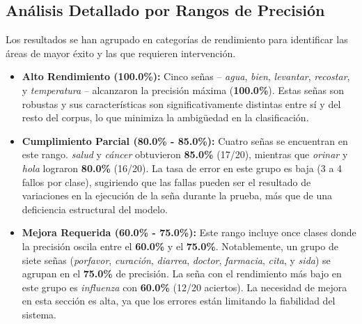 \subsection{Análisis Detallado por Rangos de Precisión}

Los resultados se han agrupado en categorías de rendimiento para identificar las áreas de mayor éxito y las que requieren intervención.

\begin{itemize}
    \item \textbf{Alto Rendimiento (100.0\%):}
    Cinco señas -- \textit{agua}, \textit{bien}, \textit{levantar}, \textit{recostar}, y \textit{temperatura} -- alcanzaron la precisión máxima (\textbf{100.0\%}). Estas señas son robustas y sus características son significativamente distintas entre sí y del resto del corpus, lo que minimiza la ambigüedad en la clasificación.

    \item \textbf{Cumplimiento Parcial (80.0\% - 85.0\%):}
    Cuatro señas se encuentran en este rango. \textit{salud} y \textit{cáncer} obtuvieron \textbf{85.0\%} (17/20), mientras que \textit{orinar} y \textit{hola} lograron \textbf{80.0\%} (16/20). La tasa de error en este grupo es baja (3 a 4 fallos por clase), sugiriendo que las fallas pueden ser el resultado de variaciones en la ejecución de la seña durante la prueba, más que de una deficiencia estructural del modelo.

    \item \textbf{Mejora Requerida (60.0\% - 75.0\%):}
    Este rango incluye once clases donde la precisión oscila entre el \textbf{60.0\%} y el \textbf{75.0\%}. Notablemente, un grupo de siete señas (\textit{porfavor}, \textit{curación}, \textit{diarrea}, \textit{doctor}, \textit{farmacia}, \textit{cita}, y \textit{sida}) se agrupan en el \textbf{75.0\%} de precisión. La seña con el rendimiento más bajo en este grupo es \textit{influenza} con \textbf{60.0\%} (12/20 aciertos). La necesidad de mejora en esta sección es alta, ya que los errores están limitando la fiabilidad del sistema.


\end{itemize}
